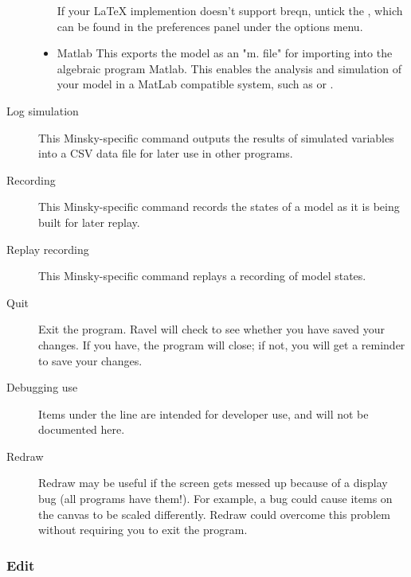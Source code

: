 \begin{description}
\begin{itemize}
If your LaTeX implemention doesn't support breqn, untick the , which can be found in the preferences panel under the options menu.
  \item Matlab
This exports the model as an "m. file" for importing into the algebraic program Matlab. This enables the analysis and simulation of your model in a MatLab compatible system, such as  or .


\end{itemize}


\item[Log simulation] This Minsky-specific command outputs the results of simulated variables into a CSV data file for later use in other programs.

\item[Recording] This Minsky-specific command records the states of a model as it is being built for later replay.

\item[Replay recording] This Minsky-specific command replays a recording of model states.

\item[Quit] Exit the program. Ravel will check to see whether you have saved your changes. If you have, the program will close; if not, you will get a reminder to save your changes.

\item[Debugging use] Items under the line are intended for developer use, and will not be documented here.

\item[Redraw] Redraw may be useful if the screen gets messed up because of a display bug (all programs have them!). For example, a bug could cause items on the canvas to be scaled differently. Redraw could overcome this problem without requiring you to exit the program.

\end{description}

\subsubsection{Edit}
\label{Edit}


